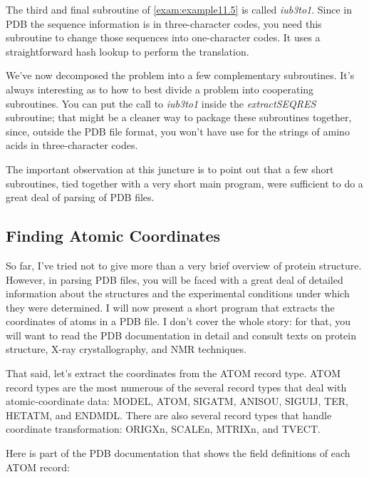 The third and final subroutine of \autoref{exam:example11.5} is called \textit{iub3to1}. Since in PDB the sequence information is in three-character codes, you need this subroutine to change those sequences into one-character codes. It uses a straightforward hash lookup to perform the translation.

We've now decomposed the problem into a few complementary subroutines. It's always interesting as to how to best divide a problem into cooperating subroutines. You can put the call to \textit{iub3to1} inside the \textit{extractSEQRES} subroutine; that might be a cleaner way to package these subroutines together, since, outside the PDB file format, you won't have use for the strings of amino acids in three-character codes.

The important observation at this juncture is to point out that a few short subroutines, tied together with a very short main program, were sufficient to do a great deal of parsing of PDB files. 

\subsection{Finding Atomic Coordinates}
So far, I've tried not to give more than a very brief overview of protein structure. However, in parsing PDB files, you will be faced with a great deal of detailed information about the structures and the experimental conditions under which they were determined. I will now present a short program that extracts the coordinates of atoms in a PDB file. I don't cover the whole story: for that, you will want to read the PDB documentation in detail and consult texts on protein structure, X-ray crystallography, and NMR techniques.

That said, let's extract the coordinates from the ATOM record type. ATOM record types are the most numerous of the several record types that deal with atomic-coordinate data: MODEL, ATOM, SIGATM, ANISOU, SIGUIJ, TER, HETATM, and ENDMDL. There are also several record types that handle coordinate transformation: ORIGXn, SCALEn, MTRIXn, and TVECT.

Here is part of the PDB documentation that shows the field definitions of each ATOM record: 

